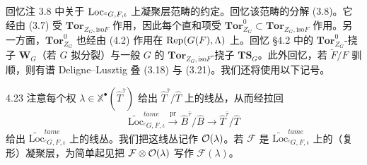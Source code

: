 回忆注 3.8 中关于 $\operatorname{Loc}_{{}^cG,F,\iota}$ 上凝聚层范畴的约定。回忆该范畴的分解 (3.8)。它经由 (3.7) 受 $\mathbf{Tor}_{Z_G,\mathrm{iso}F}$ 作用，因此每个直和项受 $\mathbf{Tor}^0_{Z_G}\subset\mathbf{Tor}_{Z_G,\mathrm{iso}F}$ 作用。另一方面，$\mathbf{Tor}^0_{Z_G}$ 也经由 (4.2) 作用在 $\operatorname{Rep}(G(F),\Lambda)$ 上。回忆 §4.2 中的 $\mathbf{Tor}^0_{Z_G}$-挠子 $\mathbf{W}_G$（若 $G$ 拟分裂）与一般 $G$ 的 $\mathbf{Tor}_{Z_G,\mathrm{iso}F}$-挠子 $\mathbf{TS}_G$。此外回忆，若 $\breve F/F$ 驯顺，则有谱 Deligne–Lusztig 叠 (3.18) 与 (3.21)。我们还将使用以下记号。

\begin{notn}{4.23}
注意每个权 $\lambda\in\mathbb{X}^\bullet(\hat T^{\bar\tau})$ 给出 $\hat T^{\bar\tau}/\hat T$ 上的线丛，从而经拉回
\[
\widetilde{\mathrm{Loc}}^{tame}_{{}^cG,F,\iota}\xrightarrow{\ \mathrm{pr}\ }\hat B^{\bar\tau}/\hat B\to\hat T^{\bar\tau}/\hat T
\]
给出 $\widetilde{\mathrm{Loc}}^{tame}_{{}^cG,F,\iota}$ 上的线丛。我们把这线丛记作 $\mathcal{O}(\lambda)$。若 $\mathcal{F}$ 是 $\widetilde{\mathrm{Loc}}^{tame}_{{}^cG,F,\iota}$ 上的（复形）凝聚层，为简单起见把 $\mathcal{F}\otimes\mathcal{O}(\lambda)$ 写作 $\mathcal{F}(\lambda)$。
\end{notn}

